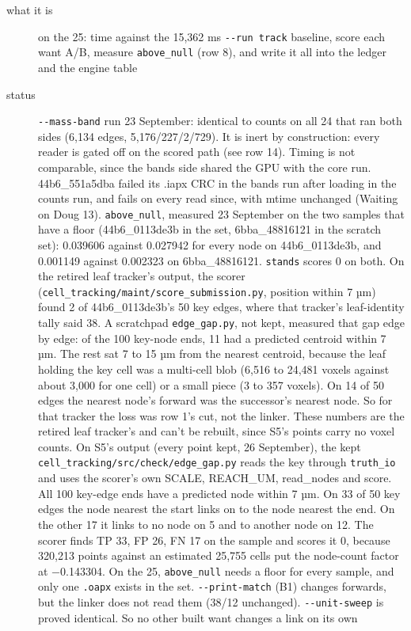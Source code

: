 \begin{description}
\item[{what it is}] on the 25: time against the 15,362 ms \texttt{-\allowbreak{}-\allowbreak{}run track} baseline, score each want A/B, measure \texttt{above\_\allowbreak{}null} (row 8), and write it all into the ledger and the engine table
\item[{status}] \texttt{-\allowbreak{}-\allowbreak{}mass-\allowbreak{}band} run 23 September: identical to counts on all 24 that ran both sides (6,134 edges, 5,176/227/2/729). It is inert by construction: every reader is gated off on the scored path (see row 14). Timing is not comparable, since the bands side shared the GPU with the core run. 44b6\_\allowbreak{}551a5dba failed its .iapx CRC in the bands run after loading in the counts run, and fails on every read since, with mtime unchanged (Waiting on Doug 13). \texttt{above\_\allowbreak{}null}, measured 23 September on the two samples that have a floor (44b6\_\allowbreak{}0113de3b in the set, 6bba\_\allowbreak{}48816121 in the scratch set): 0.039606 against 0.027942 for every node on 44b6\_\allowbreak{}0113de3b, and 0.001149 against 0.002323 on 6bba\_\allowbreak{}48816121. \texttt{stands} scores 0 on both. On the retired leaf tracker's output, the scorer (\texttt{cell\_\allowbreak{}tracking/\allowbreak{}maint/\allowbreak{}score\_\allowbreak{}submission.\allowbreak{}py}, position within 7 µm) found 2 of 44b6\_\allowbreak{}0113de3b's 50 key edges, where that tracker's leaf-identity tally said 38. A scratchpad \texttt{edge\_\allowbreak{}gap.\allowbreak{}py}, not kept, measured that gap edge by edge: of the 100 key-node ends, 11 had a predicted centroid within 7 µm. The rest sat 7 to 15 µm from the nearest centroid, because the leaf holding the key cell was a multi-cell blob (6,516 to 24,481 voxels against about 3,000 for one cell) or a small piece (3 to 357 voxels). On 14 of 50 edges the nearest node's forward was the successor's nearest node. So for that tracker the loss was row 1's cut, not the linker. These numbers are the retired leaf tracker's and can't be rebuilt, since S5's points carry no voxel counts. On S5's output (every point kept, 26 September), the kept \texttt{cell\_\allowbreak{}tracking/\allowbreak{}src/\allowbreak{}check/\allowbreak{}edge\_\allowbreak{}gap.\allowbreak{}py} reads the key through \texttt{truth\_\allowbreak{}io} and uses the scorer's own SCALE, REACH\_\allowbreak{}UM, read\_\allowbreak{}nodes and score. All 100 key-edge ends have a predicted node within 7 µm. On 33 of 50 key edges the node nearest the start links on to the node nearest the end. On the other 17 it links to no node on 5 and to another node on 12. The scorer finds TP 33, FP 26, FN 17 on the sample and scores it 0, because 320,213 points against an estimated 25,755 cells put the node-count factor at −0.143304. On the 25, \texttt{above\_\allowbreak{}null} needs a floor for every sample, and only one \texttt{.\allowbreak{}oapx} exists in the set. \texttt{-\allowbreak{}-\allowbreak{}print-\allowbreak{}match} (B1) changes forwards, but the linker does not read them (38/12 unchanged). \texttt{-\allowbreak{}-\allowbreak{}unit-\allowbreak{}sweep} is proved identical. So no other built want changes a link on its own
\end{description}

